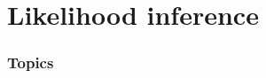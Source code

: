 \documentclass[color=usenames,dvipsnames]{beamer}\usepackage[]{graphicx}\usepackage[]{xcolor}
\begin{document}
\section{Likelihood inference}



\begin{frame}[plain]
  \frametitle{Topics}
  \Large
  \tableofcontents[currentsection]
\end{frame}




\end{document}
